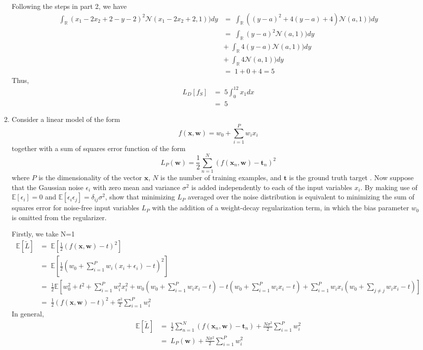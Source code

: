 \begin{enumerate}
	Following the steps in part 2, we have
	\begin{align*}
		\int_\mathbb{R}(x_1-2x_2+2-y-2)^2\mathcal{N}(x_1-2x_2+2,1))dy &=\;\int_\mathbb{R}((y-a)^2+4(y-a)+4)\mathcal{N}(a,1))dy\\
		&=\;\int_\mathbb{R}(y-a)^2\mathcal{N}(a,1))dy\\
		&+\;\int_\mathbb{R}4(y-a)\mathcal{N}(a,1))dy\\
		&+\;\int_\mathbb{R}4\mathcal{N}(a,1))dy\\
		&=\;1+0+4=5
	\end{align*}
	Thus,
	\begin{align*}
		L_D[f_S] &=\; 5\int_0^12x_1dx\\
		&=\; 5
	\end{align*}
	
	\item  
	
	Consider a linear model of the form $$f(\mathbf{x},\mathbf{w}) = w_0 + \sum_{i=1}^{P}w_ix_i$$ together with a sum of squares error function of the form 
	$$L_P(\mathbf{w}) = \frac{1}{2}\sum_{n=1}^{N}(f(\mathbf{x}_n,\mathbf{w})-\mathbf{t}_n)^2$$
	where $P$ is the dimensionality of the vector $\mathbf{x}$, $N$ is the number of training examples, and $\mathbf{t}$ is the ground truth target . Now suppose that the Gaussian noise $\epsilon_i$ with zero mean and variance $\sigma^2$ is added independently to each of the input variables $x_i$. By making use of $\mathbb{E}[\epsilon_i]=0$ and $\mathbb{E}[\epsilon_i \epsilon_j]= \delta_{ij}\sigma^2$, show that minimizing $L_P$ averaged over the noise distribution is equivalent to minimizing the sum of squares error for noise-free input variables $L_P$ with the addition of a weight-decay regularization term, in which the bias parameter $w_0$ is omitted from the regularizer.
	
	Firstly, we take N=1
\begin{align*}
\mathbb{E}[\tilde{L}] &=\; \mathbb{E}[ \frac{1}{2}(f(\mathbf{x},\mathbf{w})-t)^2]\\
&=\; \mathbb{E}[\frac{1}{2} (w_0 + \sum_{i=1}^{P}w_i(x_i+\epsilon_i)-t)^2]\\
&=\; \frac{1}{2}\mathbb{E}[w_0^2+t^2+\sum_{i=1}^{P}w_i^2x_i^2+w_0(w_0+\sum_{i=1}^{P}w_ix_i-t)-t(w_0+\sum_{i=1}^{P}w_ix_i-t)+\sum_{i=1}^{P}w_ix_i(w_0+\sum_{j\neq j}w_ix_i-t)]\\
&=\;\frac{1}{2}(f(\mathbf{x},\mathbf{w})-t)^2 + \frac{\sigma^2}{2}\sum_{i=1}^{P}w_i^2
\end{align*}
In general, 
\begin{align*}
\mathbb{E}[\tilde{L}]
&=\;\frac{1}{2}\sum_{n=1}^{N}(f(\mathbf{x}_n, \mathbf{w})-\mathbf{t}_n)+\frac{N\sigma^2}{2}\sum_{i=1}^{P}w_i^2\\
&=\; L_P(\mathbf{w})+\frac{N\sigma^2}{2}\sum_{i=1}^{P}w_i^2
\end{align*}

\end{enumerate}